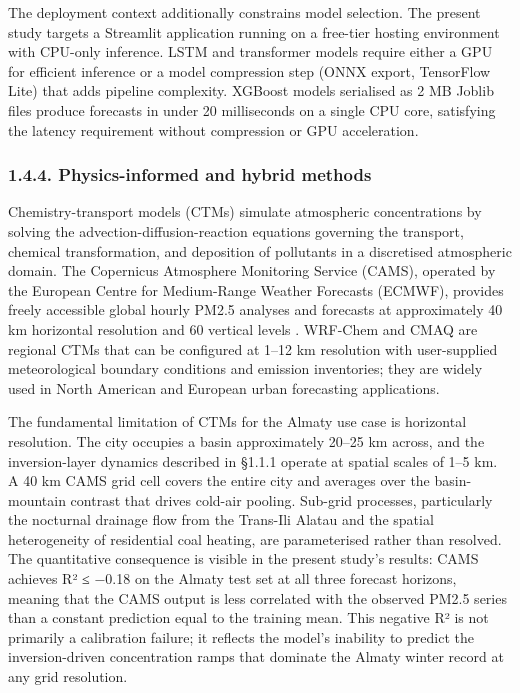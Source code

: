 The deployment context additionally constrains model selection. The present study targets a Streamlit application running on a free-tier hosting environment with CPU-only inference. LSTM and transformer models require either a GPU for efficient inference or a model compression step (ONNX export, TensorFlow Lite) that adds pipeline complexity. XGBoost models serialised as 2 MB Joblib files produce forecasts in under 20 milliseconds on a single CPU core, satisfying the latency requirement without compression or GPU acceleration.

\subsubsection{1.4.4. Physics-informed and hybrid methods}\label{physics-informed-and-hybrid-methods}

Chemistry-transport models (CTMs) simulate atmospheric concentrations by solving the advection-diffusion-reaction equations governing the transport, chemical transformation, and deposition of pollutants in a discretised atmospheric domain. The Copernicus Atmosphere Monitoring Service (CAMS), operated by the European Centre for Medium-Range Weather Forecasts (ECMWF), provides freely accessible global hourly PM2.5 analyses and forecasts at approximately 40 km horizontal resolution and 60 vertical levels \cite{inness2019cams}. WRF-Chem and CMAQ are regional CTMs that can be configured at 1--12 km resolution with user-supplied meteorological boundary conditions and emission inventories; they are widely used in North American and European urban forecasting applications.

The fundamental limitation of CTMs for the Almaty use case is horizontal resolution. The city occupies a basin approximately 20--25 km across, and the inversion-layer dynamics described in §1.1.1 operate at spatial scales of 1--5 km. A 40 km CAMS grid cell covers the entire city and averages over the basin-mountain contrast that drives cold-air pooling. Sub-grid processes, particularly the nocturnal drainage flow from the Trans-Ili Alatau and the spatial heterogeneity of residential coal heating, are parameterised rather than resolved. The quantitative consequence is visible in the present study's results: CAMS achieves R² ≤ −0.18 on the Almaty test set at all three forecast horizons, meaning that the CAMS output is less correlated with the observed PM2.5 series than a constant prediction equal to the training mean. This negative R² is not primarily a calibration failure; it reflects the model's inability to predict the inversion-driven concentration ramps that dominate the Almaty winter record at any grid resolution.

